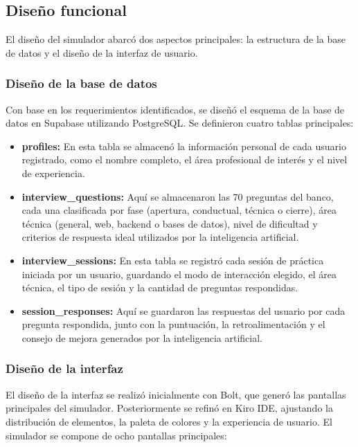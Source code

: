 \subsection{Diseño funcional}

El diseño del simulador abarcó dos aspectos principales: la estructura
de la base de datos y el diseño de la interfaz de usuario.

\subsubsection{Diseño de la base de datos}

Con base en los requerimientos identificados, se diseñó el esquema
de la base de datos en Supabase utilizando PostgreSQL. Se definieron
cuatro tablas principales:

\begin{itemize}
    \item \textbf{profiles:} En esta tabla se almacenó la información
    personal de cada usuario registrado, como el nombre completo,
    el área profesional de interés y el nivel de experiencia.

    \item \textbf{interview\_questions:} Aquí se almacenaron las
    70 preguntas del banco, cada una clasificada por fase (apertura,
    conductual, técnica o cierre), área técnica (general, web,
    backend o bases de datos), nivel de dificultad y criterios de
    respuesta ideal utilizados por la inteligencia artificial.

    \item \textbf{interview\_sessions:} En esta tabla se registró
    cada sesión de práctica iniciada por un usuario, guardando el
    modo de interacción elegido, el área técnica, el tipo de sesión
    y la cantidad de preguntas respondidas.

    \item \textbf{session\_responses:} Aquí se guardaron las
    respuestas del usuario por cada pregunta respondida, junto con
    la puntuación, la retroalimentación y el consejo de mejora
    generados por la inteligencia artificial.
\end{itemize}

\subsubsection{Diseño de la interfaz}

El diseño de la interfaz se realizó inicialmente con Bolt, que generó
las pantallas principales del simulador. Posteriormente se refinó en
Kiro IDE, ajustando la distribución de elementos, la paleta de
colores y la experiencia de usuario. El simulador se compone de
ocho pantallas principales:

